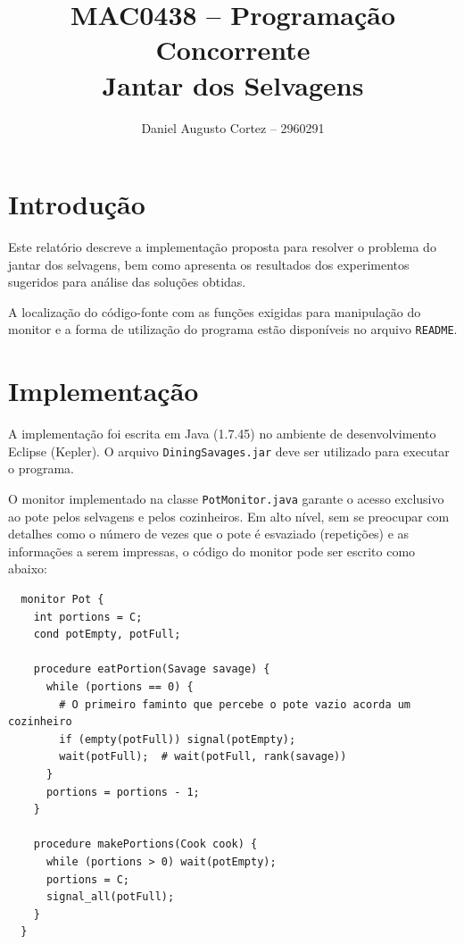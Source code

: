 \documentclass[11pt,a4paper]{article}
\newcommand{\zerar}{\setcounter{equation}{0}\setcounter{figure}{0}\setcounter{table}{0}}
\begin{document}
\title{
  {\sc MAC0438 -- Programação Concorrente} \\ 
  \vspace{0.5cm} 
  {\bf Jantar dos Selvagens}
}
\author{Daniel Augusto Cortez -- 2960291}
\date{}
\maketitle


\zerar
\section{Introdução}
\label{sec:intro}

Este relatório descreve a implementação proposta para resolver o problema do jantar dos selvagens, 
bem como apresenta os resultados dos experimentos sugeridos para análise das soluções obtidas. 

A localização do código-fonte com as funções exigidas para manipulação do monitor e a forma de 
utilização do programa estão disponíveis no arquivo \verb|README|.


\zerar
\section{Implementação}
\label{sec:imp}

A implementação foi escrita em Java (1.7.45) no ambiente de desenvolvimento Eclipse (Kepler). O 
arquivo \verb|DiningSavages.jar| deve ser utilizado para executar o programa.

O monitor implementado na classe \verb|PotMonitor.java| garante o acesso exclusivo ao pote pelos
selvagens e pelos cozinheiros. Em alto nível, sem se preocupar com detalhes como o número de vezes 
que o pote é esvaziado (repetições) e as informações a serem impressas, o código do monitor pode ser 
escrito como abaixo:

\begin{verbatim}
  monitor Pot {
    int portions = C;
    cond potEmpty, potFull;

    procedure eatPortion(Savage savage) {
      while (portions == 0) {
        # O primeiro faminto que percebe o pote vazio acorda um cozinheiro
        if (empty(potFull)) signal(potEmpty);
        wait(potFull);  # wait(potFull, rank(savage)) 
      }
      portions = portions - 1;
    }

    procedure makePortions(Cook cook) {
      while (portions > 0) wait(potEmpty);
      portions = C;
      signal_all(potFull);
    }
  }
\end{verbatim}
\end{document}
